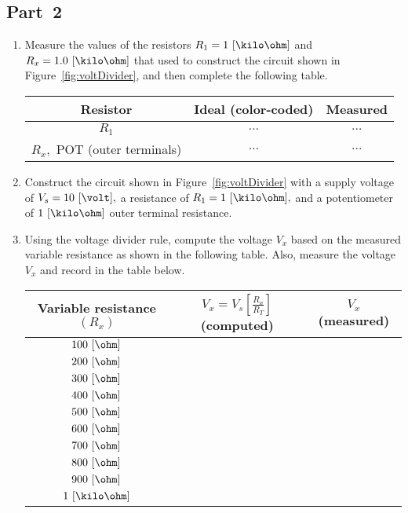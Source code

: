 \subsection{Part~2}
\label{sec:part2}
\begin{enumerate}
\item Measure the values of the resistors $R_1=1~[\kilo\ohm]$ and $R_x=1.0~[\kilo\ohm]$ that used to construct the circuit shown in Figure~\ref{fig:voltDivider}, and then complete the following table.


  \begin{center}
    \begin{tabular}{c|c|c}
      \toprule
      Resistor &  Ideal (color-coded) & Measured\\
      \toprule
      $R_1$ & $\ldots$ & $\ldots$\\   %
      $R_x,$ POT (outer terminals) & $\ldots$ & $\ldots$\\   %
      \bottomrule
    \end{tabular}    
  \end{center}


\item Construct the circuit shown in Figure~\ref{fig:voltDivider} with a supply voltage  of $V_s = 10~[\volt],$ a resistance of $R_1=1~[\kilo\ohm],$ and  a potentiometer of $1~[\kilo\ohm]$ outer terminal resistance.  

  
\item Using the voltage divider rule, compute the voltage $V_x$ based on the measured variable resistance as shown in the following table. Also, measure the voltage $V_x$ and record in the table below. 


  \begin{center}
  \begin{tabular}{|c|c|c|}
    \toprule
    Variable resistance $(R_x)$ & $V_x=V_s\left[\frac{R_x}{R_T}\right]$ (computed) & $V_x$ (measured) \\    
    \toprule    
    $100~[\ohm]$ &&\\
    $200~[\ohm]$ &&\\
    $300~[\ohm]$ &&\\
    $400~[\ohm]$ &&\\
    $500~[\ohm]$ &&\\
    $600~[\ohm]$ &&\\
    $700~[\ohm]$ &&\\
    $800~[\ohm]$ &&\\
    $900~[\ohm]$ &&\\    
    $1~[\kilo\ohm]$ &&\\
    \bottomrule
  \end{tabular}    
  \end{center}



\end{enumerate}
